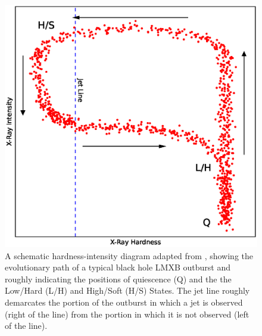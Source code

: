 \begin{figure}
   \centering
    \includegraphics[width=\columnwidth, trim = 10mm 13mm 10mm 15mm, clip]{images/Fender_D.eps}
    \captionsetup{singlelinecheck=off}
    \caption[A schematic hardness-intensity diagram adapted from \citet{Fender_UniJets}, showing the evolutionary path of a typical black hole LMXB outburst.]{A schematic hardness-intensity diagram adapted from \citet{Fender_UniJets}, showing the evolutionary path of a typical black hole LMXB outburst and roughly indicating the positions of quiescence (Q) and the the Low/Hard (L/H) and High/Soft (H/S) States.  The jet line roughly demarcates the portion of the outburst in which a jet is observed (right of the line) from the portion in which it is not observed (left of the line).}
   \label{fig:Fender}
\end{figure}

